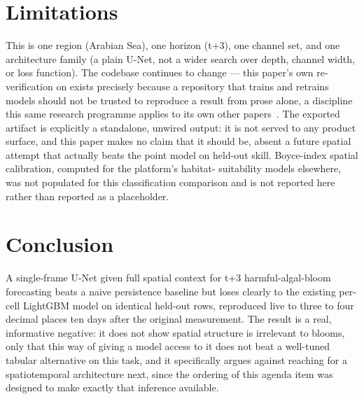 \section{Limitations}
\label{sec:limitations}

This is one region (Arabian Sea), one horizon (t+3), one channel set, and
one architecture family (a plain U-Net, not a wider search over depth,
channel width, or loss function). The codebase continues to change --- this
paper's own re-verification on \AsOf{} exists precisely because a repository
that trains and retrains models should not be trusted to reproduce a
result from prose alone, a discipline this same research programme applies
to its own other papers~\citep{risingskill2026}. The exported artifact is
explicitly a standalone, unwired output: it is not served to any product
surface, and this paper makes no claim that it should be, absent a future
spatial attempt that actually beats the point model on held-out skill.
Boyce-index spatial calibration, computed for the platform's habitat-
suitability models elsewhere, was not populated for this classification
comparison and is not reported here rather than reported as a placeholder.

\section{Conclusion}

A single-frame U-Net given full spatial context for t+3 harmful-algal-bloom
forecasting beats a naive persistence baseline but loses clearly to the
existing per-cell LightGBM model on \NTestRows{} identical held-out rows,
reproduced live to three to four decimal places ten days after the original
measurement. The result is a real, informative negative: it does not show
spatial structure is irrelevant to blooms, only that this way of giving a
model access to it does not beat a well-tuned tabular alternative on this
task, and it specifically argues against reaching for a spatiotemporal
architecture next, since the ordering of this agenda item was designed to
make exactly that inference available.
